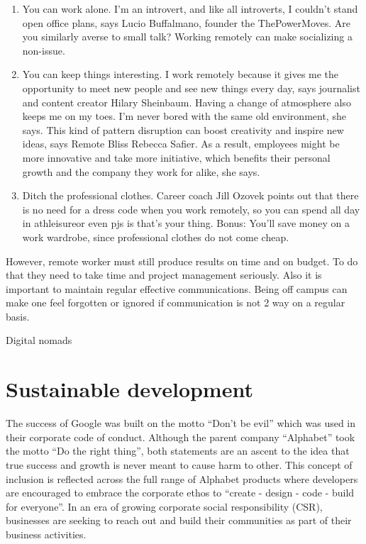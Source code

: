 \documentclass[]{book}
\begin{document}
\begin{enumerate}
\item
  You can work alone. I'm an introvert, and like all introverts, I couldn't stand open office plans, says Lucio Buffalmano, founder the ThePowerMoves. Are you similarly averse to small talk? Working remotely can make socializing a non-issue.
\item
  You can keep things interesting. I work remotely because it gives me the opportunity to meet new people and see new things every day, says journalist and content creator Hilary Sheinbaum. Having a change of atmosphere also keeps me on my toes. I'm never bored with the same old environment, she says. This kind of pattern disruption can boost creativity and inspire new ideas, says Remote Bliss Rebecca Safier. As a result, employees might be more innovative and take more initiative, which benefits their personal growth and the company they work for alike, she says.
\item
  Ditch the professional clothes.
  Career coach Jill Ozovek points out that there is no need for a dress code when you work remotely, so you can spend all day in athleisureor even pjs is that's your thing. Bonus: You'll save money on a work wardrobe, since professional clothes do not come cheap.
\end{enumerate}

However, remote worker must still produce results on time and on budget. To do that they need to take time and project management seriously. Also it is important to maintain regular effective communications. Being off campus can make one feel forgotten or ignored if communication is not 2 way on a regular basis.

Digital nomads

\hypertarget{sustainable-development}{%
\section{Sustainable development}\label{sustainable-development}}

The success of Google was built on the motto ``Don't be evil'' which was used in their corporate code of conduct. Although the parent company ``Alphabet'' took the motto ``Do the right thing'', both statements are an ascent to the idea that true success and growth is never meant to cause harm to other. This concept of inclusion is reflected across the full range of Alphabet products where developers are encouraged to embrace the corporate ethos to ``create - design - code - build for everyone''. In an era of growing corporate social responsibility (CSR), businesses are seeking to reach out and build their communities as part of their business activities.
\end{document}
